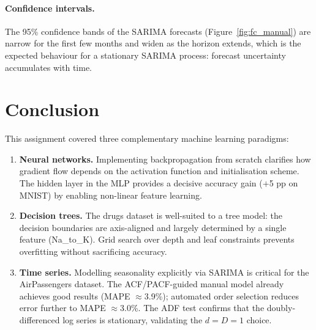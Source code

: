 \documentclass[12pt,a4paper]{article}
\begin{document}
\paragraph{Confidence intervals.}
The 95\% confidence bands of the SARIMA forecasts (Figure~\ref{fig:fc_manual})
are narrow for the first few months and widen as the horizon extends, which is
the expected behaviour for a stationary SARIMA process: forecast uncertainty
accumulates with time.

\section{Conclusion}

This assignment covered three complementary machine learning paradigms:

\begin{enumerate}
  \item \textbf{Neural networks.}  Implementing backpropagation from scratch
        clarifies how gradient flow depends on the activation function and
        initialisation scheme.  The hidden layer in the MLP provides a
        decisive accuracy gain ($+$5 pp on MNIST) by enabling non-linear
        feature learning.

  \item \textbf{Decision trees.}  The drugs dataset is well-suited to a tree
        model: the decision boundaries are axis-aligned and largely determined
        by a single feature (Na\_to\_K).  Grid search over depth and leaf
        constraints prevents overfitting without sacrificing accuracy.

  \item \textbf{Time series.}  Modelling seasonality explicitly via SARIMA is
        critical for the AirPassengers dataset.  The ACF/PACF-guided manual
        model already achieves good results (MAPE $\approx$3.9\%); automated
        order selection reduces error further to MAPE $\approx$3.0\%.  The ADF
        test confirms that the doubly-differenced log series is stationary,
        validating the $d=D=1$ choice.
\end{enumerate}
\end{document}
